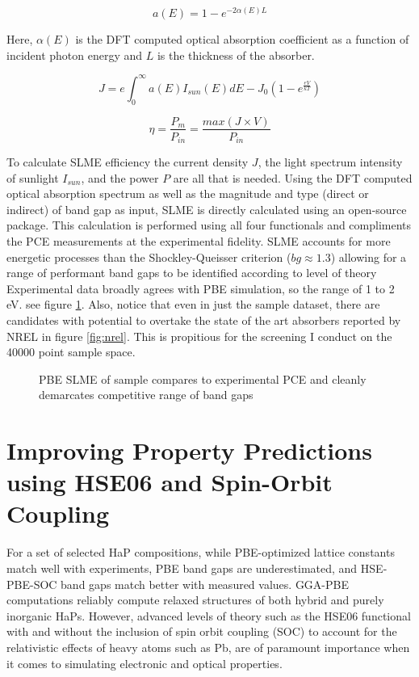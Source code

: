 \[
\label{eq:absorption_alpha}
a(E)=1-e^{-2\alpha(E)L}
\]

Here, \(\alpha(E)\) is the DFT computed optical absorption coefficient
as a function of incident photon energy and \(L\) is the thickness of
the absorber.

\[
\label{eq:slme_int}
J=e\int_{0}^{\infty} a(E)I_{sun}(E)dE - J_{0}(1-e^{\frac{eV}{kT}})
\]

\[
\label{eq:slme_sum}
\eta = \frac{P_{m}}{P_{in}}=\frac{max(J \times V)}{P_{in}}
\]

To calculate SLME efficiency the current density \(J\), the light spectrum intensity of sunlight \(I_{sun}\), and the power \(P\) are all that is needed.
Using the DFT computed optical absorption spectrum as well as the magnitude and type (direct or indirect) of band gap as input, SLME is directly calculated using an open-source package.
\autocite{williams-2022-sl3me}
This calculation is performed using all four functionals and compliments the PCE measurements at the experimental fidelity.
SLME accounts for more energetic processes than the Shockley-Queisser criterion (\(bg \approx 1.3\)) allowing for a range of performant band gaps to be identified according to level of theory\autocite[p.1]{yu-2012-ident-poten}
Experimental data\autocite{almora-2020-devic-perfor} broadly agrees with PBE simulation, so the range of 1 to 2 \unit{\electronvolt}.
see figure \ref{fig:slme}.
Also, notice that even in just the sample dataset, there are candidates with potential to overtake the state of the art absorbers reported by NREL in figure \ref{fig:nrel}.
This is propitious for the screening I conduct on the 40000 point sample space.

 
\begin{figure}[htbp]
\centering

\caption{\label{fig:slme} PBE SLME of sample compares to experimental PCE and cleanly demarcates competitive range of band gaps}
\end{figure}

\section{Improving Property Predictions using HSE06 and Spin-Orbit Coupling}
\label{sec:org8020a56}
For a set of selected HaP compositions, while PBE-optimized lattice constants match well with experiments, PBE band gaps are underestimated, and HSE-PBE-SOC band gaps match better with measured values.
GGA-PBE computations reliably compute relaxed structures of both hybrid and purely inorganic HaPs.
However, advanced levels of theory such as the HSE06 functional with and without the inclusion of spin orbit coupling (SOC) to account for the relativistic effects of heavy atoms such as Pb, are of paramount importance when it comes to simulating electronic and optical properties.

